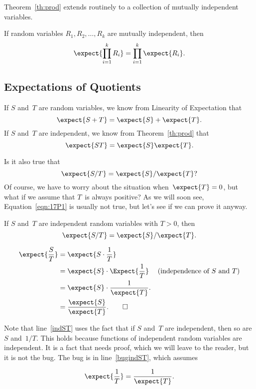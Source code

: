 Theorem~\ref{th:prod} extends routinely to a collection of mutually
independent variables.
\begin{corollary}
If random variables $R_1, R_2, \dots, R_k$ are mutually
independent, then
\[
\expect{\prod_{i=1}^k R_i} = \prod_{i=1}^k \expect{R_i}.
\]
\end{corollary}


\begin{editingnotes}
\section{Expectations of Quotients}

If $S$ and~$T$ are random variables, we know from Linearity of
Expectation that
\begin{equation*}
    \expect{S + T} = \expect{S} + \expect{T}.
\end{equation*}
If $S$ and~$T$ are independent, we know from Theorem~\ref{th:prod}
that
\begin{equation*}
    \expect{ST} = \expect{S} \expect{T}.
\end{equation*}

Is it also true that
\begin{equation}\label{eqn:17P1}
    \expect{S/T} = \expect{S}/\expect{T}?
\end{equation}
Of course, we have to worry about the situation when~$\expect{T} = 0$,
but what if we assume that $T$~is always positive?  As we will soon
see, Equation~\ref{eqn:17P1} is usually not true, but let's see if we
can prove it anyway.

\begin{falseclm}\label{fc:17P2}
If $S$ and~$T$ are independent random variables with $T > 0$, then
\begin{equation}
    \expect{S/T} = \expect{S}/\expect{T}.
\end{equation}
\end{falseclm}

\begin{bogusproof}
\begin{align}
\expect{\frac{S}{T}} & = \expect{S \cdot \frac{1}{T}} \notag\\
       & = \expect{S} \cdot \Expect{\frac{1}{T}} & \text{(independence of $S$
       and $T$)}\label{indST}\\
      & = \expect{S} \cdot \frac{1}{\expect{T}}. \label{bugindST}\\
      & = \frac{\expect{S}}{\expect{T}}.\notag \qedhere
\end{align}
\end{bogusproof}
Note that line~\ref{indST} uses the fact that if $S$ and~$T$ are
independent, then so are $S$ and~$1/T$.  This holds because functions
of independent random variables are independent.  It is a fact that
needs proof, which we will leave to the reader, but it is not the
bug. The bug is in line~\eqref{bugindST}, which assumes
\begin{falseclm}\label{false-inverse}
\[
\expect{\frac{1}{T}} =  \frac{1}{\expect{T}}.
\]
\end{falseclm}


\end{editingnotes}
